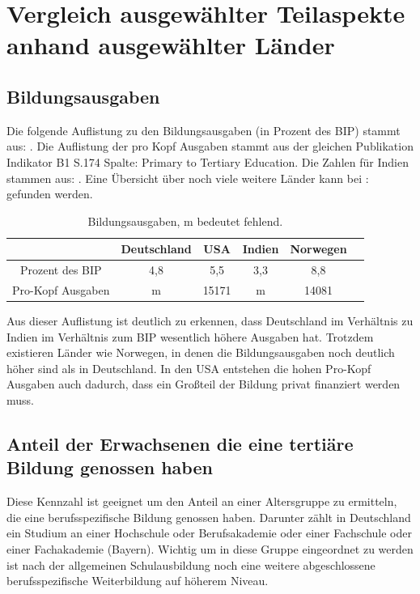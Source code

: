 \section{Vergleich ausgewählter Teilaspekte anhand ausgewählter Länder}

\subsection*{Bildungsausgaben}
Die folgende Auflistung zu den Bildungsausgaben (in Prozent des BIP) stammt aus: \cite[Indikator B4. S.219]{oecd5}. 
Die Auflistung der pro Kopf Ausgaben stammt aus der gleichen Publikation Indikator B1 S.174 Spalte: Primary to Tertiary Education.
Die Zahlen für Indien stammen aus: \cite[2]{oester}. Eine Übersicht über noch viele weitere Länder kann bei : \cite[165]{hdr} gefunden werden.

\begin{table}[htp]
\begin{tabular}{|c|c|c|c|c|c|}
\hline  	& Deutschland & USA & Indien  & Norwegen \\ 
\hline 	Prozent des BIP &4,8 & 5,5  & 3,3  & 8,8 \\ 
\hline  Pro-Kopf Ausgaben & m & 15171 & m & 14081 \\ 
\hline 
\end{tabular} 
\caption{Bildungsausgaben, m bedeutet fehlend.}
\end{table}
Aus dieser Auflistung ist deutlich zu erkennen, dass Deutschland im Verhältnis zu Indien im Verhältnis zum BIP wesentlich höhere Ausgaben hat. Trotzdem existieren Länder wie Norwegen, in denen die Bildungsausgaben noch deutlich höher sind als in Deutschland. In den USA entstehen die hohen Pro-Kopf Ausgaben auch dadurch, dass ein Großteil der Bildung privat finanziert werden muss.

\subsection*{Anteil der Erwachsenen die eine tertiäre Bildung genossen haben}
Diese Kennzahl ist geeignet um den Anteil an einer Altersgruppe zu ermitteln, die eine berufsspezifische Bildung genossen haben. Darunter zählt in Deutschland ein Studium an einer Hochschule oder Berufsakademie oder einer Fachschule oder einer Fachakademie (Bayern). Wichtig um in diese Gruppe eingeordnet zu werden ist nach der allgemeinen Schulausbildung noch eine weitere abgeschlossene berufsspezifische Weiterbildung auf höherem Niveau.

